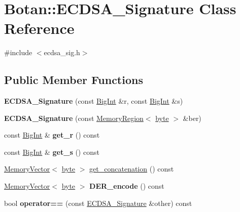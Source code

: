 \hypertarget{classBotan_1_1ECDSA__Signature}{\section{Botan\-:\-:E\-C\-D\-S\-A\-\_\-\-Signature Class Reference}
\label{classBotan_1_1ECDSA__Signature}
}


{\ttfamily \#include $<$ecdsa\-\_\-sig.\-h$>$}

\subsection*{Public Member Functions}
\begin{DoxyCompactItemize}
\item 
\hypertarget{classBotan_1_1ECDSA__Signature_a72bf568b2096a414e03ea847f1ee24df}{{\bfseries E\-C\-D\-S\-A\-\_\-\-Signature} (const \hyperlink{classBotan_1_1BigInt}{Big\-Int} \&r, const \hyperlink{classBotan_1_1BigInt}{Big\-Int} \&s)}\label{classBotan_1_1ECDSA__Signature_a72bf568b2096a414e03ea847f1ee24df}

\item 
\hypertarget{classBotan_1_1ECDSA__Signature_a10a92fab90e73133aeca7bf9656390c1}{{\bfseries E\-C\-D\-S\-A\-\_\-\-Signature} (const \hyperlink{classBotan_1_1MemoryRegion}{Memory\-Region}$<$ \hyperlink{namespaceBotan_a7d793989d801281df48c6b19616b8b84}{byte} $>$ \&ber)}\label{classBotan_1_1ECDSA__Signature_a10a92fab90e73133aeca7bf9656390c1}

\item 
\hypertarget{classBotan_1_1ECDSA__Signature_a07c11f2a64d37e035c874952c34c7c33}{const \hyperlink{classBotan_1_1BigInt}{Big\-Int} \& {\bfseries get\-\_\-r} () const }\label{classBotan_1_1ECDSA__Signature_a07c11f2a64d37e035c874952c34c7c33}

\item 
\hypertarget{classBotan_1_1ECDSA__Signature_a1460c25c57a5dd985a41a7385cd5ef66}{const \hyperlink{classBotan_1_1BigInt}{Big\-Int} \& {\bfseries get\-\_\-s} () const }\label{classBotan_1_1ECDSA__Signature_a1460c25c57a5dd985a41a7385cd5ef66}

\item 
\hyperlink{classBotan_1_1MemoryVector}{Memory\-Vector}$<$ \hyperlink{namespaceBotan_a7d793989d801281df48c6b19616b8b84}{byte} $>$ \hyperlink{classBotan_1_1ECDSA__Signature_ad17dc27a41fb0dcd2cc5a625eb67960a}{get\-\_\-concatenation} () const 
\item 
\hypertarget{classBotan_1_1ECDSA__Signature_ac8a5b1f0aa539251d39cdccef702863d}{\hyperlink{classBotan_1_1MemoryVector}{Memory\-Vector}$<$ \hyperlink{namespaceBotan_a7d793989d801281df48c6b19616b8b84}{byte} $>$ {\bfseries D\-E\-R\-\_\-encode} () const }\label{classBotan_1_1ECDSA__Signature_ac8a5b1f0aa539251d39cdccef702863d}

\item 
\hypertarget{classBotan_1_1ECDSA__Signature_a030b4fab4c565c6d895d1a5e03e595f8}{bool {\bfseries operator==} (const \hyperlink{classBotan_1_1ECDSA__Signature}{E\-C\-D\-S\-A\-\_\-\-Signature} \&other) const }\label{classBotan_1_1ECDSA__Signature_a030b4fab4c565c6d895d1a5e03e595f8}

\end{DoxyCompactItemize}
